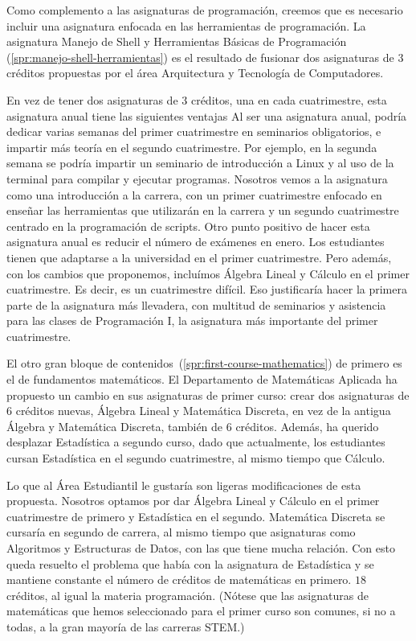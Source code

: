 Como complemento a las asignaturas de programación,
creemos que es necesario incluir
una asignatura enfocada en las herramientas de programación.
La asignatura Manejo de Shell y Herramientas Básicas de Programación~%
(\cref{spr:manejo-shell-herramientas})
es el resultado de fusionar dos asignaturas de $3$ créditos propuestas por
el área Arquitectura y Tecnología de Computadores.

En vez de tener dos asignaturas de $3$ créditos,
una en cada cuatrimestre,
esta asignatura anual tiene las siguientes ventajas
Al ser una asignatura anual,
podría dedicar varias semanas del primer cuatrimestre
en seminarios obligatorios,
e impartir más teoría en el segundo cuatrimestre.
Por ejemplo, en la segunda semana se podría impartir un seminario de
introducción a Linux y al uso de la terminal para compilar y ejecutar programas.
Nosotros vemos a la asignatura como una introducción a la carrera,
con un primer cuatrimestre enfocado en
enseñar las herramientas que utilizarán en la carrera
y un segundo cuatrimestre centrado en la programación de scripts.
Otro punto positivo de hacer esta asignatura anual es
reducir el número de exámenes en enero.
Los estudiantes tienen que adaptarse a la universidad en el primer cuatrimestre.
Pero además, con los cambios que proponemos,
incluímos Álgebra Lineal y Cálculo en el primer cuatrimestre.
Es decir, es un cuatrimestre difícil.
Eso justificaría hacer la primera parte de la asignatura más llevadera,
con multitud de seminarios y asistencia para las clases de Programación I,
la asignatura más importante del primer cuatrimestre.

El otro gran bloque de contenidos~(\cref{spr:first-course-mathematics})
de primero es el de fundamentos matemáticos.
El Departamento de Matemáticas Aplicada
ha propuesto un cambio en sus asignaturas de primer curso:
crear dos asignaturas de $6$ créditos nuevas,
Álgebra Lineal y Matemática Discreta,
en vez de la antigua Álgebra y Matemática Discreta,
también de $6$ créditos.
Además, ha querido desplazar Estadística a segundo curso,
dado que actualmente,
los estudiantes cursan Estadística en el segundo cuatrimestre,
al mismo tiempo que Cálculo.

Lo que al Área Estudiantil le gustaría son
ligeras modificaciones de esta propuesta.
Nosotros optamos por dar Álgebra Lineal y Cálculo
en el primer cuatrimestre de primero y
Estadística en el segundo.
Matemática Discreta se cursaría en segundo de carrera,
al mismo tiempo que asignaturas como Algoritmos y Estructuras de Datos,
con las que tiene mucha relación.
Con esto queda resuelto el problema que había con la asignatura de Estadística y
se mantiene constante el número de créditos de matemáticas en primero.
$18$ créditos, al igual la materia programación.
(Nótese que las asignaturas de matemáticas que
hemos seleccionado para el primer curso
son comunes, si no a todas, a la gran mayoría de las carreras STEM.)

